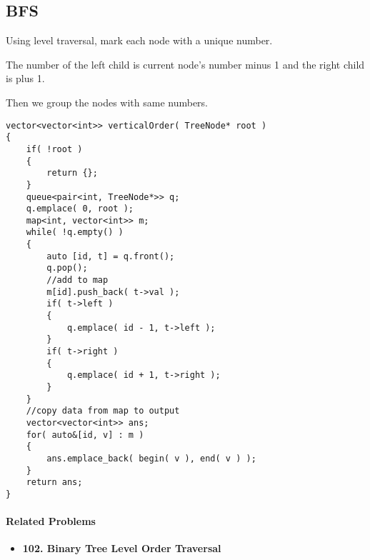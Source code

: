 \subsection{BFS}
Using level traversal, mark each node with a unique number. 

The number of the left child is current node's number minus 1 and the right child is plus 1.

Then we group the nodes with same numbers.


\setcounter{lstlisting}{0}
\begin{lstlisting}[style=customc, caption={BFS}]
vector<vector<int>> verticalOrder( TreeNode* root )
{
    if( !root )
    {
        return {};
    }
    queue<pair<int, TreeNode*>> q;
    q.emplace( 0, root );
    map<int, vector<int>> m;
    while( !q.empty() )
    {
        auto [id, t] = q.front();
        q.pop();
        //add to map
        m[id].push_back( t->val );
        if( t->left )
        {
            q.emplace( id - 1, t->left );
        }
        if( t->right )
        {
            q.emplace( id + 1, t->right );
        }
    }
    //copy data from map to output
    vector<vector<int>> ans;
    for( auto&[id, v] : m )
    {
        ans.emplace_back( begin( v ), end( v ) );
    }
    return ans;
}
\end{lstlisting}

\paragraph{Related Problems}
\begin{itemize}
\item \textbf{102. Binary Tree Level Order Traversal}
\end{itemize}